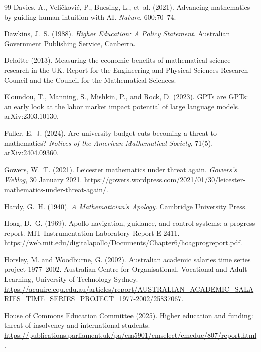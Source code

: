 \documentclass[11pt]{article}
\theoremstyle{definition}
\theoremstyle{remark}
\begin{document}
\begin{thebibliography}{99}
Davies, A., Veli\v{c}kovi\'c, P., Buesing, L., et~al. (2021).
\newblock Advancing mathematics by guiding human intuition with AI.
\newblock \emph{Nature}, 600:70--74.

Dawkins, J.~S. (1988).
\newblock \emph{Higher Education: A Policy Statement}.
\newblock Australian Government Publishing Service, Canberra.

Deloitte (2013).
\newblock Measuring the economic benefits of mathematical science research in the UK.
\newblock Report for the Engineering and Physical Sciences Research Council and the Council for the Mathematical Sciences.

Eloundou, T., Manning, S., Mishkin, P., and Rock, D. (2023).
\newblock GPTs are GPTs: an early look at the labor market impact potential of large language models.
\newblock arXiv:2303.10130.

Fuller, E.~J. (2024).
\newblock Are university budget cuts becoming a threat to mathematics?
\newblock \emph{Notices of the American Mathematical Society}, 71(5). arXiv:2404.09360.

Gowers, W.~T. (2021).
\newblock Leicester mathematics under threat again.
\newblock \emph{Gowers's Weblog}, 30 January 2021. \url{https://gowers.wordpress.com/2021/01/30/leicester-mathematics-under-threat-again/}.

Hardy, G.~H. (1940).
\newblock \emph{A Mathematician's Apology}.
\newblock Cambridge University Press.

Hoag, D.~G. (1969).
\newblock Apollo navigation, guidance, and control systems: a progress report.
\newblock MIT Instrumentation Laboratory Report E-2411. \url{https://web.mit.edu/digitalapollo/Documents/Chapter6/hoagprogreport.pdf}.

Horsley, M. and Woodburne, G. (2002).
\newblock Australian academic salaries time series project 1977--2002.
\newblock Australian Centre for Organisational, Vocational and Adult Learning, University of Technology Sydney. \url{https://acquire.cqu.edu.au/articles/report/AUSTRALIAN_ACADEMIC_SALARIES_TIME_SERIES_PROJECT_1977-2002/25837067}.

House of Commons Education Committee (2025).
\newblock Higher education and funding: threat of insolvency and international students.
\newblock \url{https://publications.parliament.uk/pa/cm5901/cmselect/cmeduc/807/report.html}.


\end{thebibliography}
\end{document}
